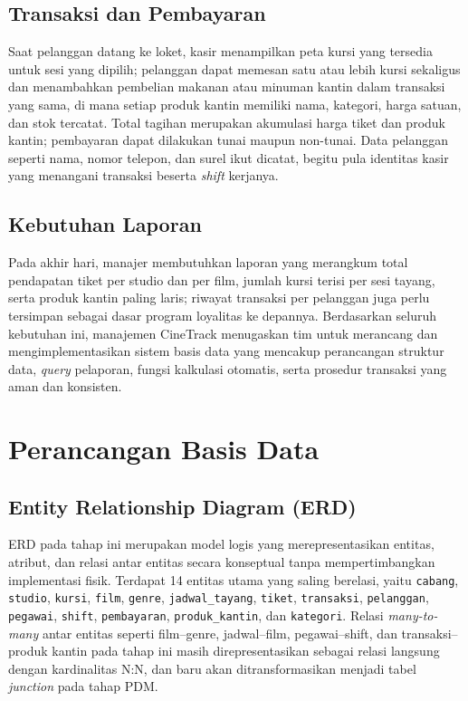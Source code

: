 \documentclass[letter,12pt,bahasa]{article}
\begin{document}
\subsection{Transaksi dan Pembayaran}

Saat pelanggan datang ke loket, kasir menampilkan peta kursi yang tersedia untuk sesi yang dipilih; pelanggan dapat memesan satu atau lebih kursi sekaligus dan menambahkan pembelian makanan atau minuman kantin dalam transaksi yang sama, di mana setiap produk kantin memiliki nama, kategori, harga satuan, dan stok tercatat. Total tagihan merupakan akumulasi harga tiket dan produk kantin; pembayaran dapat dilakukan tunai maupun non-tunai. Data pelanggan seperti nama, nomor telepon, dan surel ikut dicatat, begitu pula identitas kasir yang menangani transaksi beserta \textit{shift} kerjanya.

\subsection{Kebutuhan Laporan}

Pada akhir hari, manajer membutuhkan laporan yang merangkum total pendapatan tiket per studio dan per film, jumlah kursi terisi per sesi tayang, serta produk kantin paling laris; riwayat transaksi per pelanggan juga perlu tersimpan sebagai dasar program loyalitas ke depannya. Berdasarkan seluruh kebutuhan ini, manajemen CineTrack menugaskan tim untuk merancang dan mengimplementasikan sistem basis data yang mencakup perancangan struktur data, \textit{query} pelaporan, fungsi kalkulasi otomatis, serta prosedur transaksi yang aman dan konsisten.

\clearpage

\section{Perancangan Basis Data}

\subsection{Entity Relationship Diagram (ERD)}

ERD pada tahap ini merupakan model logis yang merepresentasikan entitas, atribut, dan relasi antar entitas secara konseptual tanpa mempertimbangkan implementasi fisik. Terdapat 14 entitas utama yang saling berelasi, yaitu \texttt{cabang}, \texttt{studio}, \texttt{kursi}, \texttt{film}, \texttt{genre}, \texttt{jadwal\_tayang}, \texttt{tiket}, \texttt{transaksi}, \texttt{pelanggan}, \texttt{pegawai}, \texttt{shift}, \texttt{pembayaran}, \texttt{produk\_kantin}, dan \texttt{kategori}. Relasi \textit{many-to-many} antar entitas seperti film--genre, jadwal--film, pegawai--shift, dan transaksi--produk kantin pada tahap ini masih direpresentasikan sebagai relasi langsung dengan kardinalitas N:N, dan baru akan ditransformasikan menjadi tabel \textit{junction} pada tahap PDM.
\end{document}
